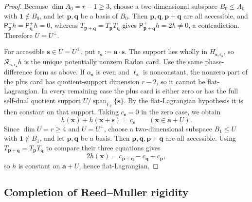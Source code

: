 \documentclass[11pt,letterpaper,onecolumn]{article}
\theoremstyle{plain}
\theoremstyle{definition}
\theoremstyle{remark}
\newcommand{\Ftwo}{\mathbb F_2}
\newcommand{\Span}{\operatorname{span}}
\newcommand{\one}{\mathbf 1}
\begin{document}
\begin{proof}
Because \(\dim A_0=r-1\ge3\), choose a two-dimensional subspace
\(B_0\le A_0\) with \(\one\notin B_0\), and let \({\mathbf{p}},{\mathbf{q}}\) be a basis of
\(B_0\).  Then \({\mathbf{p}},{\mathbf{q}},{\mathbf{p}}+{\mathbf{q}}\) are all accessible, and
\(\mathsf P_{\mathbf{p}}^+h=\mathsf P_{\mathbf{q}}^+h=0\), whereas
\(T_{{\mathbf{p}}+{\mathbf{q}}}=T_{\mathbf{p}}T_{\mathbf{q}}\) gives
\(\mathsf P_{{\mathbf{p}}+{\mathbf{q}}}^+h=2h\ne0\), a contradiction.
Therefore \(U=U^\perp\).

For accessible \({\mathbf{s}}\in U=U^\perp\), put
\(\epsilon_{\mathbf{s}}:={\mathbf{a}}\cdot {\mathbf{s}}\).  The support lies wholly in
\(H_{{\mathbf{s}},\epsilon_{\mathbf{s}}}\), so \(\mathcal R_{{\mathbf{s}},\epsilon_{\mathbf{s}}}h\) is the unique
potentially nonzero Radon card.  Use the same phase-difference form
as above.
If \(\alpha_{\mathbf{s}}\) is even and \(\ell_{\mathbf{s}}\) is nonconstant, the nonzero part of
the plus card has quotient-support dimension \(r-2\), so it cannot be
flat-Lagrangian.  In every remaining case the plus card is either zero or
has the full self-dual quotient support \(U/\Span_{\Ftwo}\{{\mathbf{s}}\}\). By the
flat-Lagrangian hypothesis it is then constant on that support.  Taking
\(c_{\mathbf{s}}=0\) in the zero case, we obtain
\begin{equation*}
  h({\mathbf{x}})+h({\mathbf{x}}+{\mathbf{s}})=c_{\mathbf{s}}
  \qquad({\mathbf{x}}\in {\mathbf{a}}+U).
\end{equation*}
Since \(\dim U=r\ge4\) and \(U=U^\perp\), choose a two-dimensional
subspace \(B_1\le U\) with \(\one\notin B_1\), and let \({\mathbf{p}},{\mathbf{q}}\) be a basis.
Then \({\mathbf{p}},{\mathbf{q}},{\mathbf{p}}+{\mathbf{q}}\) are all accessible.  Using \(T_{{\mathbf{p}}+{\mathbf{q}}}=T_{\mathbf{p}}T_{\mathbf{q}}\) to compare
their three equations gives
\[
  2h({\mathbf{x}})=c_{{\mathbf{p}}+{\mathbf{q}}}-c_{\mathbf{q}}+c_{\mathbf{p}},
\]
so \(h\) is constant on \({\mathbf{a}}+U\), hence flat-Lagrangian.
\end{proof}

\subsection{Completion of Reed--Muller rigidity}
\end{document}
